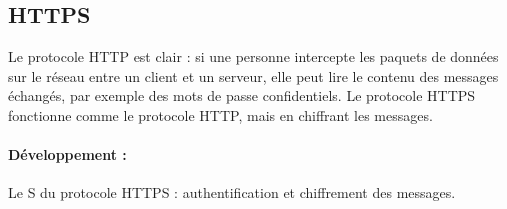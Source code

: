 \subsection{HTTPS}

Le protocole HTTP est clair : si une personne intercepte les paquets de données sur le réseau entre un client et un serveur, elle peut lire le contenu des messages échangés, par exemple des mots de passe confidentiels. Le protocole HTTPS fonctionne comme le protocole HTTP, mais en chiffrant les messages. 

\paragraph{Développement :} Le S du protocole HTTPS : authentification et chiffrement des messages.

